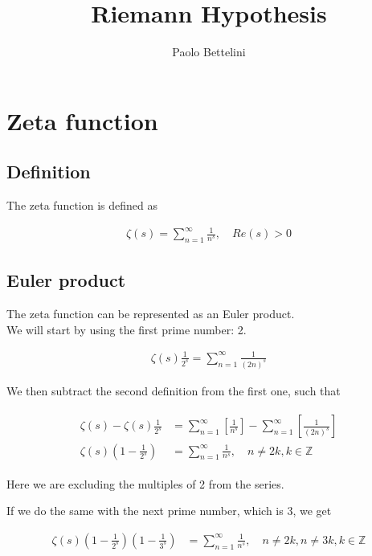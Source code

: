 \documentclass{article}
\title{Riemann Hypothesis}
\author{Paolo Bettelini}
\date{}
\begin{document}
\maketitle
\tableofcontents
\pagebreak

\section{Zeta function}

\subsection{Definition}

The zeta function is defined as

\begin{align*}
    \zeta(s)=\sum_{n=1}^{\infty}\frac{1}{n^s},\quad Re(s)>0
\end{align*}

\subsection{Euler product}

The zeta function can be represented as an Euler product.
\\
We will start by using the first prime number: 2.

\begin{align*}
    \zeta(s)\frac{1}{2^s}=\sum_{n=1}^{\infty}\frac{1}{(2n)^s}
\end{align*}

We then subtract the second definition from the first one, such that

\begin{align*}
    \begin{split}
        \zeta(s)-\zeta(s)\frac{1}{2^s}&=
        \sum_{n=1}^{\infty}\left[\frac{1}{n^s}\right]-
        \sum_{n=1}^{\infty}\left[\frac{1}{(2n)^s}\right]
        \\
        \zeta(s)\left(1-\frac{1}{2^s}\right)&=
        \sum_{n=1}^{\infty}\frac{1}{n^s},
        \quad n\neq 2k,k\in \mathds{Z}
    \end{split}
\end{align*}

Here we are excluding the multiples of 2 from the series.

If we do the same with the next prime number, which is 3, we get

\begin{align*}
    \zeta(s)\left(1-\frac{1}{2^s}\right)\left(1-\frac{1}{3^s}\right)&=
    \sum_{n=1}^{\infty}\frac{1}{n^s},
    \quad n\neq 2k,n\neq 3k, k\in \mathds{Z}
\end{align*}
\end{document}
